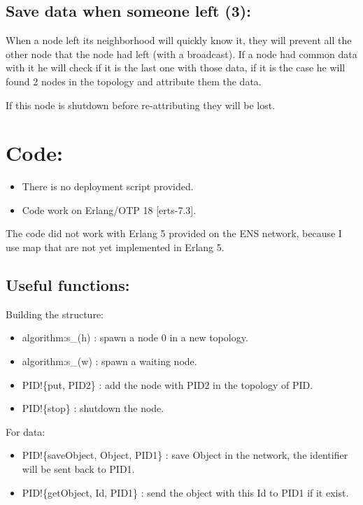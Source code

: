 \documentclass[10pt,a4paper]{article}
\begin{document}
		\subsection{Save data when someone left (3):}
			When a node left its neighborhood will quickly know it, they will prevent all the other node that the node had left (with a broadcast). If a node had common data with it he will check if it is the last one with those data, if it is the case he will found 2 nodes in the topology and attribute them the data.
			
			\medbreak
			If this node is shutdown before re-attributing they will be lost.
		
		
		\section{Code:}
		
		\begin{itemize}
			\item There is no deployment script provided.
			\item Code work on Erlang/OTP 18 [erts-7.3].
		\end{itemize}
		The code did not work with Erlang 5 provided on the ENS network, because I use map that are not yet implemented in Erlang 5.
		
		\subsection{Useful functions:}
		Building the structure:
		\begin{itemize}
			\item algorithm:s\_(h) 	: spawn a node 0 in a new topology.
			\item algorithm:s\_(w) 	: spawn a waiting node.
			\item PID!\{put, PID2\} : add the node with PID2 in the topology of PID.
			\item PID!\{stop\}		: shutdown the node.
		\end{itemize}
		
		For data:
		\begin{itemize}
			\item PID!\{saveObject, Object, PID1\} : save Object in the network, the identifier will be sent back to PID1.
			\item PID!\{getObject, Id, PID1\} : send the object with this Id to PID1 if it exist.
		\end{itemize}

			
			
\end{document}
